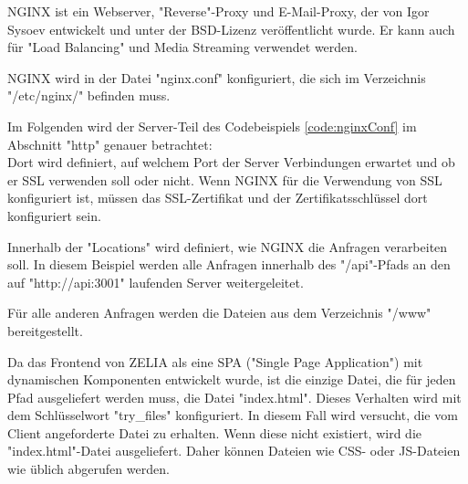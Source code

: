 

NGINX ist ein Webserver, "Reverse"-Proxy und E-Mail-Proxy, der von Igor Sysoev entwickelt und unter der BSD-Lizenz veröffentlicht wurde. 
Er kann auch für "Load Balancing" und Media Streaming verwendet werden.
\cite{WikiNginx}
\cite{nginx}

NGINX wird in der Datei "nginx.conf" konfiguriert, die sich im Verzeichnis \linebreak \mbox{\ttfamily "/etc/nginx/"} befinden muss. 


Im Folgenden wird der Server-Teil des Codebeispiels \ref{code:nginxConf} im Abschnitt "{\ttfamily http}" genauer betrachtet: \\
Dort wird definiert, auf welchem Port der Server Verbindungen erwartet und ob er SSL verwenden soll oder nicht. 
Wenn NGINX für die Verwendung von SSL konfiguriert ist, müssen das SSL-Zertifikat und der Zertifikatsschlüssel dort konfiguriert sein.

Innerhalb der "Locations" wird definiert, wie NGINX die Anfragen verarbeiten soll. In diesem Beispiel werden alle Anfragen innerhalb des "{\ttfamily /api}"-Pfads an den auf \mbox{"{\ttfamily http://api:3001}"} laufenden Server weitergeleitet.

Für alle anderen Anfragen werden die Dateien aus dem Verzeichnis "{\ttfamily /www}" bereitgestellt. 

Da das Frontend von ZELIA als eine SPA ("Single Page Application") mit dynamischen Komponenten entwickelt wurde, ist die einzige Datei, die für jeden Pfad ausgeliefert werden muss, die Datei "{\ttfamily index.html}". 
Dieses Verhalten wird mit dem Schlüsselwort "{\ttfamily try\_files}" konfiguriert. 
In diesem Fall wird versucht, die vom Client angeforderte Datei zu erhalten. 
Wenn diese nicht existiert, wird die "{\ttfamily index.html}"-Datei ausgeliefert. 
Daher können Dateien wie CSS- oder JS-Dateien wie üblich abgerufen werden.


